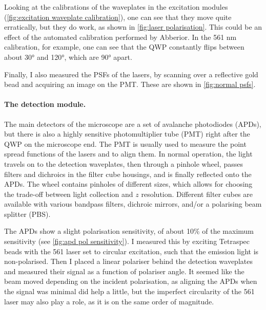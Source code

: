 Looking at the calibrations of the waveplates in the excitation modules (\autoref{fig:excitation waveplate calibration}), one can see that they move quite erratically, but they do work, as shown in \autoref{fig:laser polarisation}. This could be an effect of the automated calibration performed by Abberior. In the 561 nm calibration, for example, one can see that the QWP constantly flips between about \ang{30} and \ang{120}, which are \ang{90} apart. 

Finally, I also measured the PSFs of the lasers, by scanning over a reflective gold bead and acquiring an image on the PMT. These are shown in \autoref{fig:normal psfs}.

\paragraph{The detection module.} The main detectors of the microscope are a set of avalanche photodiodes (APDs), but there is also a highly sensitive photomultiplier tube (PMT) right after the QWP on the microscope end. The PMT is usually used to measure the point spread functions of the lasers and to align them. In normal operation, the light travels on to the detection waveplates, then through a pinhole wheel, passes filters and dichroics in the filter cube housings, and is finally reflected onto the APDs. The wheel contains pinholes of different sizes, which allows for choosing the trade-off between light collection and $ z $ resolution. Different filter cubes are available with various bandpass filters, dichroic mirrors, and/or a polarising beam splitter (PBS).

The APDs show a slight polarisation sensitivity, of about 10\% of the maximum sensitivity (see \autoref{fig:apd pol sensitivity}). I measured this by exciting Tetraspec beads with the 561 laser set to circular excitation, such that the emission light is non-polarised. Then I placed a linear polariser behind the detection waveplates and measured their signal as a function of polariser angle. It seemed like the beam moved depending on the incident polarisation, as aligning the APDs when the signal was minimal did help a little, but the imperfect circularity of the 561 laser may also play a role, as it is on the same order of magnitude. 

